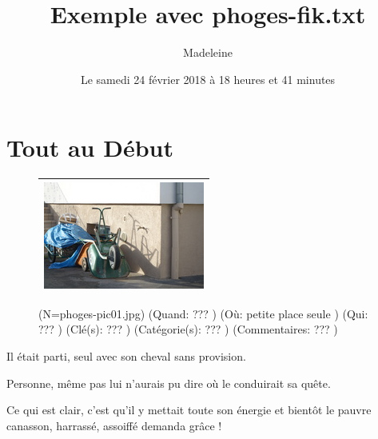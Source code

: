 \documentclass[12pt,twocolumn,french]{article}
\begin{document}
\title{Exemple avec phoges-fik.txt}
\author{Madeleine}
\date{Le samedi 24 février 2018 à 18 heures et 41 minutes}
\maketitle
\tableofcontents \newpage
%
\section{ Tout au Début}
%
  \begin{figure}[H]
    \caption{
       (N=phoges-pic01.jpg)
       (Quand: ??? )
       (Où:  petite place seule )
       (Qui: ??? )
       (Clé(s): ??? )
       (Catégorie(s): ??? )
       (Commentaires: ??? )
    }
    \vspace{4mm}
    \label{phoges-pic01.jpg}
    \noindent \centering{}
    \begin{tabular}{|c|}
      \hline
          \includegraphics[origin=c,angle=0]{phoges-pic01.jpg}
        \tabularnewline \hline
    \end{tabular}
  \end{figure}

 Il était parti, seul avec son cheval sans provision. 

 Personne, même pas lui n'aurais pu dire où le conduirait sa quête. 

 Ce qui est clair, c'est qu'il y mettait toute son énergie et bientôt le pauvre canasson, harrassé, assoiffé demanda grâce ! 
\end{document}
